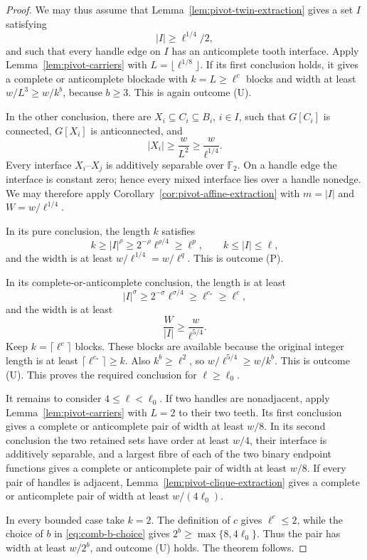 \documentclass[10pt,a4paper]{amsart}
\begin{document}
\begin{proof}
We may thus assume that Lemma~\ref{lem:pivot-twin-extraction} gives a
set $I$ satisfying
\[
                         |I|\geq\ell^{1/4}/2,
\]
and such that every handle edge on $I$ has an anticomplete tooth
interface.  Apply Lemma~\ref{lem:pivot-carriers} with
$L=\lfloor\ell^{1/8}\rfloor$.  If its first conclusion holds, it
gives a complete or anticomplete blockade with $k=L\geq\ell^c$ blocks
and width at least $w/L^3\geq w/k^b$, because $b\geq3$.  This is again
outcome (U).

In the other conclusion, there are
$X_i\subseteq C_i\subseteq B_i$, $i\in I$, such that $G[C_i]$ is
connected, $G[X_i]$ is anticonnected, and
\[
                         |X_i|\geq \frac{w}{L^2}
                                  \geq \frac{w}{\ell^{1/4}}.
\]
Every interface $X_i$--$X_j$ is additively separable over
$\mathbb F_2$.  On a handle edge the interface is constant zero; hence
every mixed interface lies over a handle nonedge.  We may therefore
apply Corollary~\ref{cor:pivot-affine-extraction} with
$m=|I|$ and $W=w/\ell^{1/4}$.

In its pure conclusion, the length $k$ satisfies
\[
 k\geq |I|^\rho
       \geq2^{-\rho}\ell^{\rho/4}
       \geq\ell^p,
 \qquad k\leq |I|\leq\ell,
\]
and the width is at least $w/\ell^{1/4}=w/\ell^q$.  This is outcome
(P).

In its complete-or-anticomplete conclusion, the length is at least
\[
 |I|^\sigma\geq2^{-\sigma}\ell^{\sigma/4}
                   \geq\ell^{c_*}\geq\ell^c,
\]
and the width is at least
\[
 \frac{W}{|I|}\geq \frac{w}{\ell^{5/4}}.
\]
Keep $k=\lceil\ell^c\rceil$ blocks.  These blocks are available because
the original integer length is at least
$\lceil\ell^{c_*}\rceil\geq k$.  Also $k^b\geq\ell^2$, so
$w/\ell^{5/4}\geq w/k^b$.  This is outcome (U).  This proves the
required conclusion for $\ell\geq\ell_0$.

It remains to consider $4\leq\ell<\ell_0$.  If two handles are
nonadjacent, apply Lemma~\ref{lem:pivot-carriers} with $L=2$ to their
two teeth.  Its first conclusion gives a complete or anticomplete pair
of width at least $w/8$.  In its second conclusion the two retained
sets have order at least $w/4$, their interface is additively separable,
and a largest fibre of each of the two binary endpoint functions gives
a complete or anticomplete pair of width at least $w/8$.  If every pair
of handles is adjacent, Lemma~\ref{lem:pivot-clique-extraction} gives a
complete or anticomplete pair of width at least $w/(4\ell_0)$.

In every bounded case take $k=2$.  The definition of $c$ gives
$\ell^c\leq2$, while the choice of $b$ in
\eqref{eq:comb-b-choice} gives
$2^b\geq\max\{8,4\ell_0\}$.  Thus the pair has width at least
$w/2^b$, and outcome (U) holds.  The theorem follows.
\end{proof}
\end{document}

